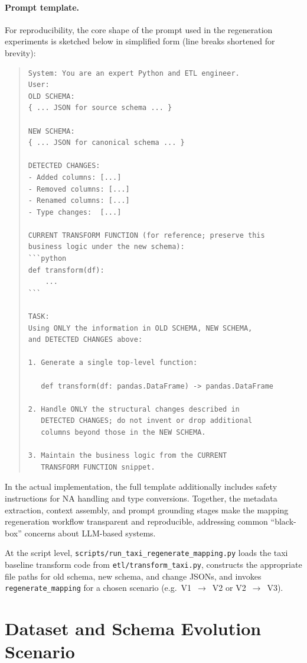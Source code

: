 \paragraph{Prompt template.}
For reproducibility, the core shape of the prompt used in the regeneration experiments is sketched
below in simplified form (line breaks shortened for brevity):
%
\begin{quote}
\begin{verbatim}
System: You are an expert Python and ETL engineer.
User:
OLD SCHEMA:
{ ... JSON for source schema ... }

NEW SCHEMA:
{ ... JSON for canonical schema ... }

DETECTED CHANGES:
- Added columns: [...]
- Removed columns: [...]
- Renamed columns: [...]
- Type changes:  [...]

CURRENT TRANSFORM FUNCTION (for reference; preserve this
business logic under the new schema):
```python
def transform(df):
    ...
```

TASK:
Using ONLY the information in OLD SCHEMA, NEW SCHEMA,
and DETECTED CHANGES above:

1. Generate a single top-level function:

   def transform(df: pandas.DataFrame) -> pandas.DataFrame

2. Handle ONLY the structural changes described in
   DETECTED CHANGES; do not invent or drop additional
   columns beyond those in the NEW SCHEMA.

3. Maintain the business logic from the CURRENT
   TRANSFORM FUNCTION snippet.
\end{verbatim}
\end{quote}

In the actual implementation, the full template additionally includes safety
instructions for NA handling and type conversions. Together, the metadata
extraction, context assembly, and prompt grounding stages make the mapping
regeneration workflow transparent and reproducible, addressing common
``black-box'' concerns about LLM-based systems.

At the script level, \texttt{scripts/run\_taxi\_regenerate\_mapping.py} loads
the taxi baseline transform code from \texttt{etl/transform\_taxi.py},
constructs the appropriate file paths for old schema, new schema, and change
JSONs, and invokes \texttt{regenerate\_mapping} for a chosen scenario
(e.g.\ V1~$\rightarrow$~V2 or V2~$\rightarrow$~V3).


\section{Dataset and Schema Evolution Scenario}
\label{sec:method-data}

